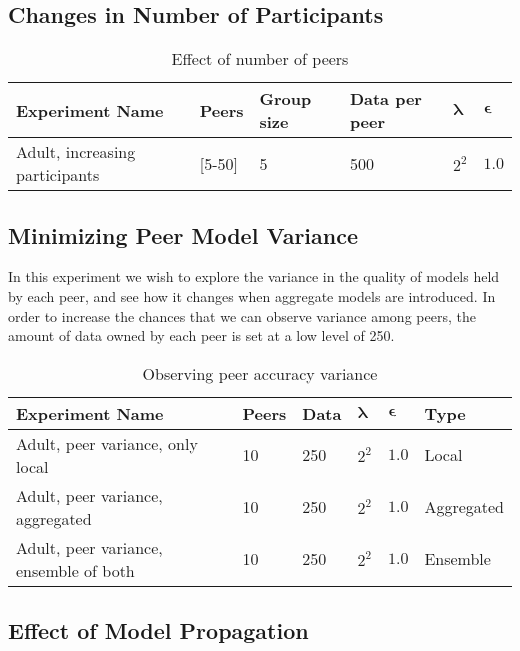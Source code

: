 \subsection{Changes in Number of Participants}

\begin{table}[h]
	\centering
	\label{tab:experiments_peer_numbers}
	\begin{tabular}{|l|l|l|l|l|l|}
		\textbf{Experiment Name}                & \textbf{Peers}      & \textbf{Group size} & \textbf{Data per peer} & $\boldsymbol{\lambda}$ & $\boldsymbol{\epsilon}$ \\
		\hline
		Adult, increasing participants & {[}5-50{]} & 5          & 500  & $2^{2}$   & $1.0$     
	\end{tabular}
	\caption{Effect of number of peers}
\end{table}

\subsection{Minimizing Peer Model Variance}

In this experiment we wish to explore the variance in the quality of models held by each peer, and see how it changes when aggregate models are introduced. In order to increase the chances that we can observe variance among peers, the amount of data owned by each peer is set at a low level of 250.

\begin{table}[h]
	\centering
	\label{tab:experiments_peer_variance}
	\begin{tabular}{|l|l|l|l|l|l|}
		{\bf Experiment Name}                  & {\bf Peers} & {\bf Data} & $\boldsymbol{\lambda}$ & $\boldsymbol{\epsilon}$ & {\bf Type} \\
		\hline
		Adult, peer variance, only local       & 10          & 250        & $2^{2}$   & $1.0$      & Local      \\
		Adult, peer variance, aggregated       & 10          & 250        & $2^{2}$   & $1.0$      & Aggregated \\
		Adult, peer variance, ensemble of both & 10          & 250        & $2^{2}$   & $1.0$      & Ensemble  
	\end{tabular}
		\caption{Observing peer accuracy variance}
\end{table}

\subsection{Effect of Model Propagation}

